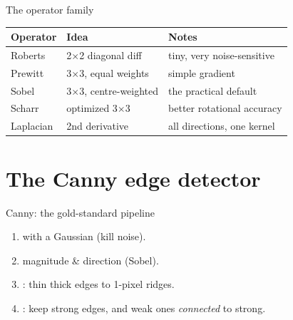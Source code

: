 \documentclass[10pt,aspectratio=169]{beamer}
\begin{document}
\begin{frame}{The operator family}
  \begin{center}
  \begin{tabular}{@{}lll@{}}
    \toprule
    \textbf{Operator} & \textbf{Idea} & \textbf{Notes} \\
    \midrule
    Roberts & 2$\times$2 diagonal diff & tiny, very noise-sensitive \\
    Prewitt & 3$\times$3, equal weights & simple gradient \\
    Sobel & 3$\times$3, centre-weighted & the practical default \\
    Scharr & optimized 3$\times$3 & better rotational accuracy \\
    Laplacian & 2nd derivative & all directions, one kernel \\
    \bottomrule
  \end{tabular}
  \end{center}
\end{frame}

\section{The Canny edge detector}

\begin{frame}{Canny: the gold-standard pipeline}
  \begin{enumerate}
    \item {} with a Gaussian (kill noise).
    \item {} magnitude \& direction (Sobel).
    \item {}: thin thick edges to 1-pixel ridges.
    \item {}: keep strong edges, and weak ones \emph{connected} to strong.
  \end{enumerate}
\end{frame}
\end{document}
